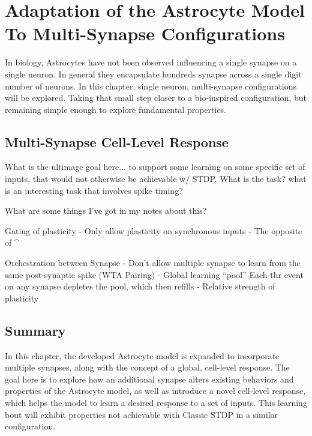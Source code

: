 \chapter{Adaptation of the Astrocyte Model To Multi-Synapse
  Configurations} \label{chapter:obj3}

In biology, Astrocytes have not been observed influencing a single synapse on a
single neuron. In general they encapsulate hundreds synapse across a single
digit number of neurons. In this chapter, single neuron, multi-synapse
configurations will be explored. Taking that small step closer to a bio-inspired
configuration, but remaining simple enough to explore fundamental properties.

\section{Multi-Synapse Cell-Level Response}
What is the ultimage goal here... to support some learning on some specific set
of inputs, that would not otherwise be achievable w/ STDP. What is the task?
what is an interesting task that involves spike timing?

What are some things I've got in my notes about this?

Gating of plasticity
  - Only allow plasticity on synchronous inputs
  - The opposite of ^
  
Orchestration between Synapse
  - Don't allow multiple synapse to learn from the same post-synaptic spike (WTA
  Pairing)
  - Global learning ``pool'' Each thr event on any synapse depletes the pool,
  which then refills
  - Relative strength of plasticity


\section{Summary}
In this chapter, the developed Astrocyte model is expanded to incorporate
multiple synapses, along with the concept of a global, cell-level response. The
goal here is to explore how an additional synapse alters existing behaviors and
properties of the Astrocyte model, as well as introduce a novel cell-level
response, which helps the model to learn a desired response to a set of
inputs. This learning bout will exhibit properties not achievable with Classic
STDP in a similar configuration.

